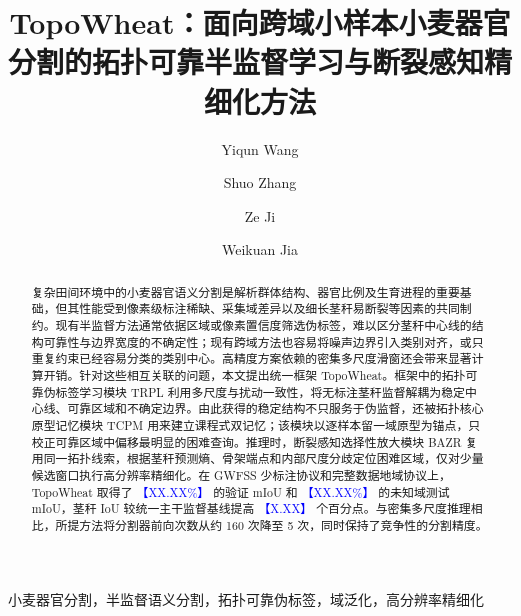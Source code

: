 \documentclass[preprint,10pt,authoryear]{elsarticle}
\newcommand{\METHOD}{TopoWheat\xspace}
\newcommand{\TRPL}{TRPL\xspace}
\newcommand{\TCPM}{TCPM\xspace}
\newcommand{\BAZR}{BAZR\xspace}
\newcommand{\placeholder}[1]{%
  \ifmmode
    \text{\textcolor{blue}{【#1】}}%
  \else
    \textcolor{blue}{【#1】}%
  \fi
}
\begin{document}
\linenumbers

\begin{frontmatter}
\title{\METHOD：面向跨域小样本小麦器官分割的拓扑可靠半监督学习与断裂感知精细化方法}
\author[1,2]{Yiqun Wang}
\author[1,2]{Shuo Zhang}
\author[3,4]{Ze Ji}
\author[1,2]{Weikuan Jia}

\begin{abstract}
复杂田间环境中的小麦器官语义分割是解析群体结构、器官比例及生育进程的重要基础，但其性能受到像素级标注稀缺、采集域差异以及细长茎秆易断裂等因素的共同制约。现有半监督方法通常依据区域或像素置信度筛选伪标签，难以区分茎秆中心线的结构可靠性与边界宽度的不确定性；现有跨域方法也容易将噪声边界引入类别对齐，或只重复约束已经容易分类的类别中心。高精度方案依赖的密集多尺度滑窗还会带来显著计算开销。针对这些相互关联的问题，本文提出统一框架 \METHOD。框架中的拓扑可靠伪标签学习模块 \TRPL 利用多尺度与扰动一致性，将无标注茎秆监督解耦为稳定中心线、可靠区域和不确定边界。由此获得的稳定结构不只服务于伪监督，还被拓扑核心原型记忆模块 \TCPM 用来建立课程式双记忆；该模块以逐样本留一域原型为锚点，只校正可靠区域中偏移最明显的困难查询。推理时，断裂感知选择性放大模块 \BAZR 复用同一拓扑线索，根据茎秆预测熵、骨架端点和内部尺度分歧定位困难区域，仅对少量候选窗口执行高分辨率精细化。在 GWFSS 少标注协议和完整数据地域协议上，\METHOD 取得了 \placeholder{XX.XX\%} 的验证 mIoU 和 \placeholder{XX.XX\%} 的未知域测试 mIoU，茎秆 IoU 较统一主干监督基线提高 \placeholder{X.XX} 个百分点。与密集多尺度推理相比，所提方法将分割器前向次数从约 160 次降至 5 次，同时保持了竞争性的分割精度。
\end{abstract}

\begin{keyword}
小麦器官分割，半监督语义分割，拓扑可靠伪标签，域泛化，高分辨率精细化
\end{keyword}

\end{frontmatter}
\end{document}
